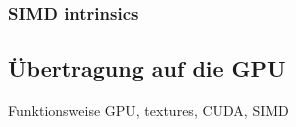 \documentclass[crop=false]{standalone}
\begin{document}

      \subsubsection{SIMD intrinsics} %
      \label{ssub:simd_intrinsics}


    \subsection{Übertragung auf die GPU} %
    \label{sub:uebertragung_auf_die_gpu}
      Funktionsweise GPU, textures, CUDA, SIMD
\end{document}
